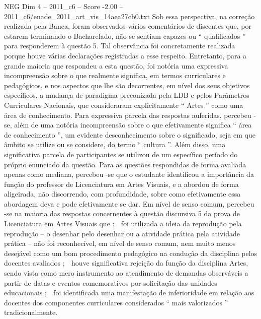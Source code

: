 \begin{textsample}{NEG Dim 4 – 2011\_c6 – Score -2.00 – 2011\_c6/enade\_2011\_art\_vis\_14aea27cb0.txt}
Sob essa perspectiva, na correção realizada pela Banca, foram observados vários comentários de discentes que, por estarem terminando o Bacharelado, não se sentiam capazes ou “ qualificados ” para responderem à questão 5.
Tal observância foi concretamente realizada porque houve várias declarações registradas a esse respeito.
Entretanto, para a grande maioria que respondeu a esta questão, foi notória uma expressiva incompreensão sobre o que realmente significa, em termos curriculares e pedagógicos, e nos aspectos que lhe são decorrentes, em nível dos seus objetivos específicos, a mudança de paradigma preconizada pela LDB e pelos Parâmetros Curriculares Nacionais, que consideraram explicitamente “ Artes ” como uma área de conhecimento.
Para expressiva parcela das respostas auferidas, percebeu -se, além de uma notória incompreensão sobre o que efetivamente significa “ área de conhecimento ”, um evidente desconhecimento sobre o significado, seja em que âmbito se utilize ou se considere, do termo “ cultura ”.
Além disso, uma significativa parcela de participantes se utilizou de um específico período do próprio enunciado da questão.
Para as questões respondidas de forma avaliada apenas como mediana, percebeu -se que o estudante identificou a importância da função do professor de Licenciatura em Artes Visuais, e a abordou de forma aligeirada, não discorrendo, com profundidade, sobre como efetivamente essa abordagem deva e pode efetivamente se dar.
Em nível de senso comum, percebeu -se na maioria das respostas concernentes à questão discursiva 5 da prova de Licenciatura em Artes Visuais que :  foi utilizada a ideia da reprodução pela reprodução – o desenhar pelo desenhar ou a atividade prática pela atividade prática – não foi reconhecível, em nível de senso comum, nem muito menos desejável como um bom procedimento pedagógico na condução da disciplina pelos docentes avaliados ;  houve significativa rejeição da função da disciplina Artes, sendo vista como mero instrumento ao atendimento de demandas observáveis a partir de datas e eventos comemorativos por solicitação das unidades educacionais ;  foi identificada uma manifestação de inferioridade em relação aos docentes dos componentes curriculares considerados “ mais valorizados ” tradicionalmente.

\end{textsample}
